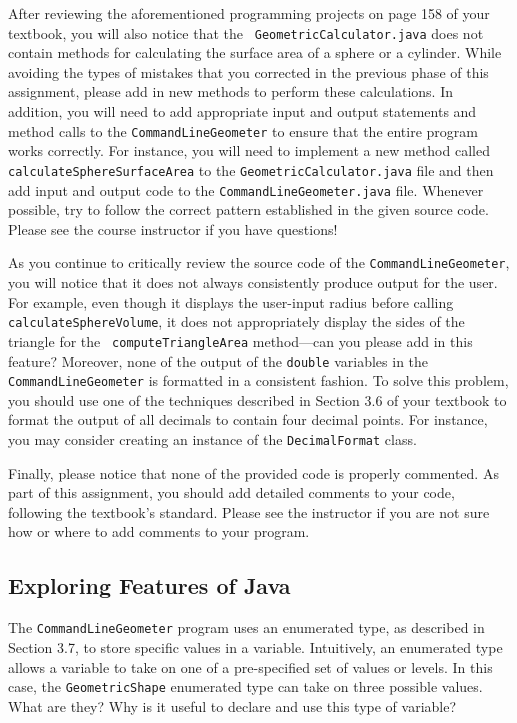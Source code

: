 \begin{sloppypar}
  After reviewing the aforementioned programming projects on page 158 of your textbook, you will also notice that the {\tt
  GeometricCalculator.java} does not contain methods for calculating the surface area of a sphere or a cylinder.  While
  avoiding the types of mistakes that you corrected in the previous phase of this assignment, please add in new methods
  to perform these calculations. In addition, you will need to add appropriate input and output statements and method
  calls to the {\tt CommandLineGeometer} to ensure that the entire program works correctly. For instance, you will need to
  implement a new method called {\tt calculateSphereSurfaceArea} to the {\tt GeometricCalculator.java} file and then add
  input and output code to the {\tt CommandLineGeometer.java} file. Whenever possible, try to follow the correct
  pattern established in the given source code. Please see the course instructor if you have questions!
\end{sloppypar}

As you continue to critically review the source code of the {\tt CommandLineGeometer}, you will notice that it does not
always consistently produce output for the user.  For example, even though it displays the user-input radius before
calling {\tt calculateSphereVolume}, it does not appropriately display the sides of the triangle for the {\tt
computeTriangleArea} method---can you please add in this feature? Moreover, none of the output of the {\tt double}
variables in the {\tt CommandLineGeometer} is formatted in a consistent fashion. To solve this problem, you should use
one of the techniques described in Section 3.6 of your textbook to format the output of all decimals to contain four
decimal points. For instance, you may consider creating an instance of the {\tt DecimalFormat} class.

Finally, please notice that none of the provided code is properly commented.  As part of this assignment, you should add
detailed comments to your code, following the textbook's standard. Please see the instructor if you are
not sure how or where to add comments to your program.

\vspace*{-.1in}
\subsection*{Exploring Features of Java}

The {\tt CommandLineGeometer} program uses an enumerated type, as described in Section 3.7, to store specific values in
a variable.  Intuitively, an enumerated type allows a variable to take on one of a pre-specified set of values or
levels.  In this case, the {\tt GeometricShape} enumerated type can take on three possible values.  What are they? Why
is it useful to declare and use this type of variable?

